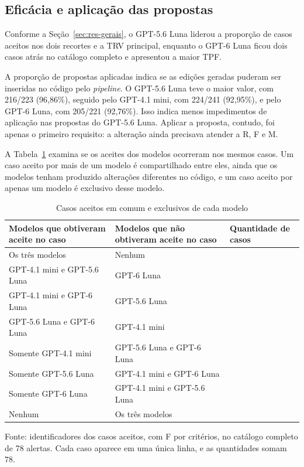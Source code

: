 \subsection{Eficácia e aplicação das propostas}
\label{sec:res-eficacia}

Conforme a Seção~\ref{sec:res-gerais}, o GPT-5.6 Luna liderou a proporção de casos aceitos nos dois recortes e a TRV principal, enquanto o GPT-6 Luna ficou dois casos atrás no catálogo completo e apresentou a maior TPF.

A proporção de propostas aplicadas indica se as edições geradas puderam ser inseridas no código pelo \textit{pipeline}. O GPT-5.6 Luna teve o maior valor, com 216/223 (96,86\%), seguido pelo GPT-4.1 mini, com 224/241 (92,95\%), e pelo GPT-6 Luna, com 205/221 (92,76\%). Isso indica menos impedimentos de aplicação nas propostas do GPT-5.6 Luna. Aplicar a proposta, contudo, foi apenas o primeiro requisito: a alteração ainda precisava atender a R, F e M.

A Tabela~\ref{tab:res-sobreposicao} examina se os aceites dos modelos ocorreram nos mesmos casos. Um caso aceito por mais de um modelo é compartilhado entre eles, ainda que os modelos tenham produzido alterações diferentes no código, e um caso aceito por apenas um modelo é exclusivo desse modelo.

\begin{table}[H]
\centering
\caption{Casos aceitos em comum e exclusivos de cada modelo}
\label{tab:res-sobreposicao}
\renewcommand{\arraystretch}{1.35}
\begin{tabularx}{\textwidth}{|>{\raggedright\arraybackslash}X|>{\raggedright\arraybackslash}X|>{\centering\arraybackslash}p{}|}
\hline
\textbf{Modelos que obtiveram aceite no caso} & \textbf{Modelos que não obtiveram aceite no caso} & \textbf{Quantidade de casos} \\
\hline
Os três modelos & Nenhum & 32 \\
\hline
GPT-4.1 mini e GPT-5.6 Luna & GPT-6 Luna & 4 \\
\hline
GPT-4.1 mini e GPT-6 Luna & GPT-5.6 Luna & 1 \\
\hline
GPT-5.6 Luna e GPT-6 Luna & GPT-4.1 mini & 11 \\
\hline
Somente GPT-4.1 mini & GPT-5.6 Luna e GPT-6 Luna & 1 \\
\hline
Somente GPT-5.6 Luna & GPT-4.1 mini e GPT-6 Luna & 4 \\
\hline
Somente GPT-6 Luna & GPT-4.1 mini e GPT-5.6 Luna & 5 \\
\hline
Nenhum & Os três modelos & 20 \\
\hline
\end{tabularx}

\vspace{0.2cm}
\begin{minipage}{\textwidth}
    \footnotesize
    Fonte: identificadores dos casos aceitos, com F por critérios, no catálogo completo de 78 alertas. Cada caso aparece em uma única linha, e as quantidades somam 78.
\end{minipage}
\end{table}


